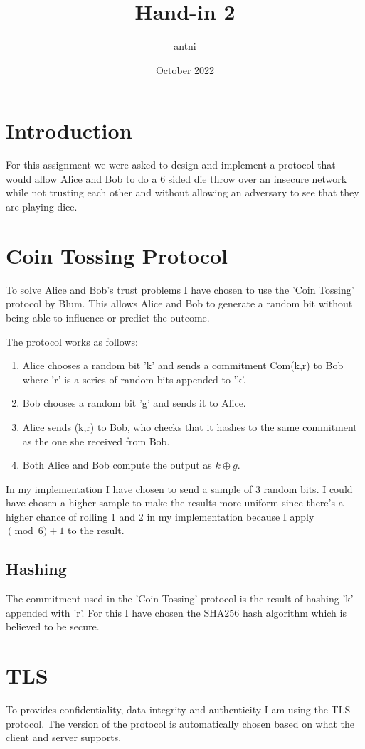 \documentclass{article}
\title{Hand-in 2}
\author{antni}
\date{October 2022}
\begin{document}
\maketitle

\section{Introduction}
For this assignment we were asked to design and implement a protocol that would allow Alice and Bob to do a 6 sided die throw over an insecure network while not trusting each other and without allowing an adversary to see that they are playing dice.

\section{Coin Tossing Protocol}
To solve Alice and Bob's trust problems I have chosen to use the 'Coin Tossing' protocol by Blum.
This allows Alice and Bob to generate a random bit without being able to influence or predict the outcome.

The protocol works as follows:
\begin{enumerate}
  \item Alice chooses a random bit 'k' and sends a commitment Com(k,r) to Bob where 'r' is a series of random bits appended to 'k'.
  \item Bob chooses a random bit 'g' and sends it to Alice.
  \item Alice sends (k,r) to Bob, who checks that it hashes to the same commitment as the one she received from Bob.
  \item Both Alice and Bob compute the output as \(k \oplus g\).
\end{enumerate}

In my implementation I have chosen to send a sample of 3 random bits. I could have chosen a higher sample to make the results more uniform since there's a higher chance of rolling 1 and 2 in my implementation because I apply \(\pmod 6 + 1\) to the result.


\subsection{Hashing}
The commitment used in the 'Coin Tossing' protocol is the result of hashing 'k' appended with 'r'.
For this I have chosen the SHA256 hash algorithm which is believed to be secure.


\section{TLS}
To provides confidentiality, data integrity and authenticity I am using the TLS protocol.
The version of the protocol is automatically chosen based on what the client and server supports.
\end{document}
